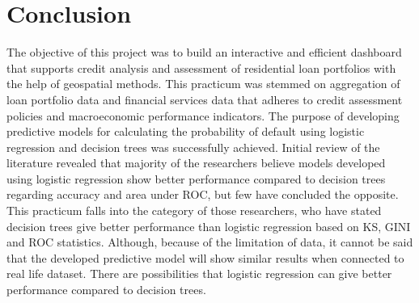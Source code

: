 \section{Conclusion}
The objective of this project was to build an interactive and efficient dashboard that supports credit analysis and assessment of residential loan portfolios with the help of geospatial methods. This practicum was stemmed on aggregation of loan portfolio data and financial services data that adheres to credit assessment policies and macroeconomic performance indicators. The purpose of developing predictive models for calculating the probability of default using logistic regression and decision trees was successfully achieved.  Initial review of the literature revealed that majority of the researchers believe models developed using logistic regression show better performance compared to decision trees regarding accuracy and area under ROC, but few have concluded the opposite. This practicum falls into the category of those researchers, who have stated decision trees give better performance than logistic regression based on KS, GINI and ROC statistics.  Although, because of the limitation of data, it cannot be said that the developed predictive model will show similar results when connected to real life dataset. There are possibilities that logistic regression can give better performance compared to decision trees.

